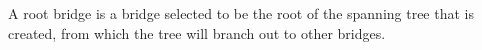 A root bridge is a bridge selected to be the root of the spanning tree that is created, from which the tree will branch out to other bridges.